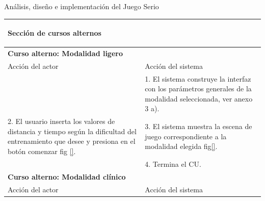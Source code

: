 \begin{thesischapter}{2} {Análisis, diseño e implementación del Juego Serio}
\begin{center}
\begin{table}
\begin{tabularx}{\textwidth}{|X|X|}
                \multicolumn{2}{|X|}{        
                \begin{minipage}[t]{0.925\columnwidth}
                    \begin{center}
                        \textbf{Sección de cursos alternos}
                    \end{center}
                \end{minipage}} \\\hline
                \multicolumn{2}{|X|}{        
                \begin{minipage}[t]{0.925\columnwidth}
                        \textbf{Curso alterno: Modalidad ligero}
                \end{minipage}} \\\hline
                
                Acción del actor & Acción del sistema \\\hline
             
                & 
                1. El sistema construye la interfaz con los parámetros generales de la modalidad seleccionada, ver anexo 3 a). \\\hline
                2. El usuario inserta los valores de distancia y tiempo según la dificultad del entrenamiento que desee y presiona en el botón comenzar fig \ref{}. 
                & 
                3. El sistema muestra la escena de juego correspondiente a la modalidad elegida fig\ref{}. \\ &4. Termina el CU. \\\hline
                
                \multicolumn{2}{|X|}{        
                \begin{minipage}[t]{0.925\columnwidth}
                        \textbf{Curso alterno: Modalidad clínico}
                \end{minipage}} \\\hline
                
                Acción del actor & Acción del sistema \\\hline
                 

\end{tabularx}
\end{table}
\end{center}
\end{thesischapter}
